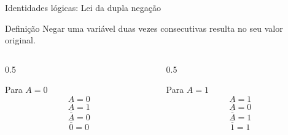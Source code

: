 
\begin{frame}{Identidades lógicas: Lei da dupla negação}
    \begin{block}{Definição}
        Negar uma variável duas vezes consecutivas resulta no seu
        valor original.
    \end{block}

    \begin{columns}[T]

        \begin{column}{0.5\textwidth}
            \begin{block}{Para $A = 0$}
                \[
                    A = 0
                \]
                \[
                    \overline{A} = 1
                \]
                \[
                    \overline{\overline{A}} = 0
                \]
                \[
                    \boxed{\overline{\overline{0}} = 0}
                \]
            \end{block}
        \end{column}

        \begin{column}{0.5\textwidth}
            \begin{block}{Para $A = 1$}
                \[
                    A = 1
                \]
                \[
                    \overline{A} = 0
                \]
                \[
                    \overline{\overline{A}} = 1
                \]
                \[
                    \boxed{\overline{\overline{1}} = 1}
                \]
            \end{block}
        \end{column}

    \end{columns}

\end{frame}